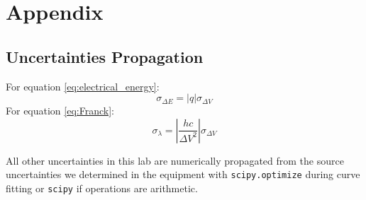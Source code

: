 \documentclass[12pt]{article}
\begin{document}
\newpage
\printbibliography


\section*{Appendix}
\subsection*{Uncertainties Propagation}
For equation \ref{eq:electrical_energy}:
$$\sigma_{\Delta E}=|q|\sigma_{\Delta V}$$
For equation \ref{eq:Franck}:
$$\sigma_{\lambda}=\left|\frac{hc}{\Delta V^2}\right|\sigma_{\Delta V}$$

All other uncertainties in this lab are numerically propagated from the source uncertainties we determined in the equipment with \texttt{scipy.optimize} during curve fitting or \texttt{scipy} if operations are arithmetic.
\end{document}
